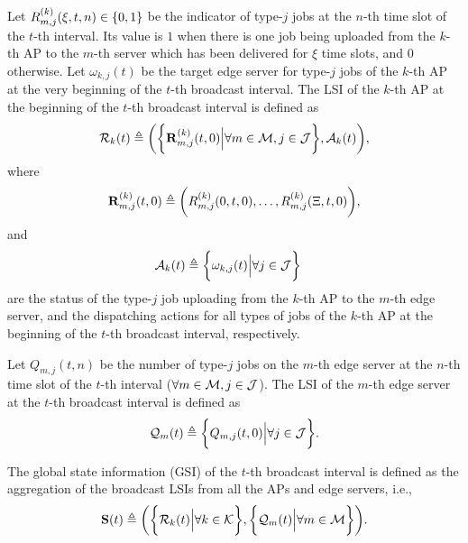 \begin{definition}
    Let $R^{(k)}_{m,j}(\xi,t,n) \in \{0,1\}$ be the indicator of type-$j$ jobs at the $n$-th time slot of the $t$-th interval.
    Its value is $1$ when there is one job being uploaded from the $k$-th AP to the $m$-th server which has been delivered for $\xi$ time slots, and $0$ otherwise.
    Let $\omega_{k,j}(t)$ be the target edge server for type-$j$ jobs of the $k$-th AP at the very beginning of the $t$-th broadcast interval.
    The LSI of the $k$-th AP at the beginning of the $t$-th broadcast interval is defined as
    {\small
    \begin{align}
        \mathcal{R}_{k}(t) \triangleq
        \bigg(
            \bigg\{\mathbf{R}^{(k)}_{m,j}(t,0) \Big| \forall m\in\mathcal{M},j\in\mathcal{J}\bigg\},
            \mathcal{A}_{k}(t)
        \bigg),
    \end{align}
    }%
    where
    {\small
    \begin{align}
        \mathbf{R}^{(k)}_{m,j}(t,0) \triangleq \bigg(
            R^{(k)}_{m,j}(0,t,0), \dots, R^{(k)}_{m,j}(\Xi,t,0)
        \bigg),
    \end{align}
    }%
    and
    {\small
    \begin{align}
        \mathcal{A}_{k}(t) &\triangleq \bigg\{\omega_{k,j}(t) \Big| \forall j\in\mathcal{J}\bigg\}
    \end{align}
    }%
    are the status of the type-$j$ job uploading from the $k$-th AP to the $m$-th edge server, and the dispatching actions for all types of jobs of the $k$-th AP at the beginning of the $t$-th broadcast interval, respectively.
\end{definition}

\begin{definition}
    Let $Q_{m,j}({t,n})$ be the number of type-$j$ jobs on the $m$-th edge server at the $n$-th time slot of the $t$-th interval ($\forall m\in\mathcal{M}, j\in\mathcal{J}$).
    The LSI of the $m$-th edge server at the $t$-th broadcast interval is defined as
    \begin{align}
        \mathcal{Q}_{m}(t) \triangleq \bigg\{
            Q_{m,j}(t, 0) \Big| \forall j\in\mathcal{J}
        \bigg\}.
    \end{align}
\end{definition}

\begin{definition}
    The global state information (GSI) of the $t$-th broadcast interval is defined as the aggregation of the broadcast LSIs from all the APs and edge servers, i.e.,
    \begin{align}
        \mathbf{S}(t) \triangleq
            \bigg(
                \bigg\{\mathcal{R}_{k}(t) \Big| \forall k\in\mathcal{K}\bigg\},
                \bigg\{\mathcal{Q}_{m}(t) \Big| \forall m\in\mathcal{M}\bigg\}
            \bigg).
    \end{align}
\end{definition}

